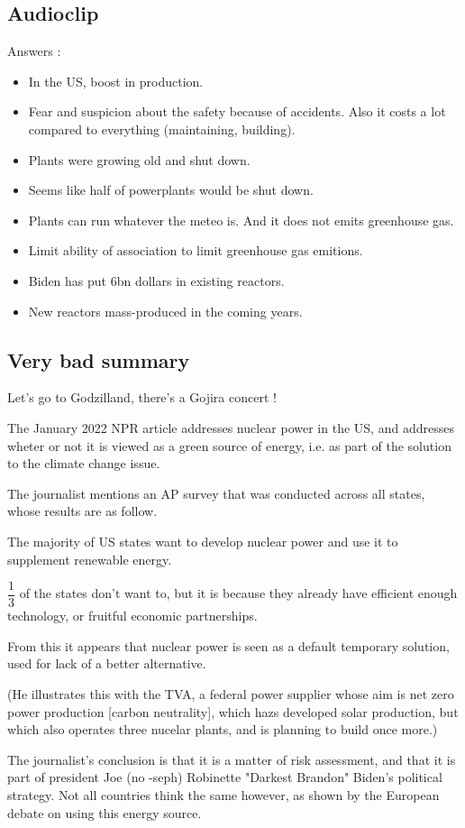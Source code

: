 \documentclass[a4paper,12pt]{book}
\begin{document}
\subsection{Audioclip}
Answers :
\begin{itemize}
\item In the US, boost in production.
\item Fear and suspicion about the safety because of accidents. Also it costs a lot compared to everything (maintaining, building).
\item Plants were growing old and shut down.
\item Seems like half of powerplants would be shut down.
\item Plants can run whatever the meteo is. And it does not emits greenhouse gas.
\item Limit ability of association to limit greenhouse gas emitions.
\item Biden has put 6bn dollars in existing reactors.
\item New reactors mass-produced in the coming years.
\end{itemize}

\subsection{Very bad summary}
Let's go to Godzilland, there's a Gojira concert !
\par The January 2022 NPR article addresses nuclear power in the US, and addresses wheter or not it is viewed as a green source of energy, i.e. as part of the solution to the climate change issue.
\par The journalist mentions an AP survey that was conducted across all states, whose results are as follow.
\par The majority of US states want to develop nuclear power and use it to supplement renewable energy.
\par $\dfrac{1}{3}$ of the states don't want to, but it is because they already have efficient enough technology, or fruitful economic partnerships.
\par From this it appears that nuclear power is seen as a default temporary solution, used for lack of a better alternative.
\par (He illustrates this with the TVA, a federal power supplier whose aim is net zero power production [carbon neutrality], which hazs developed solar production, but which also operates three nucelar plants, and is planning to build once more.)
\par The journalist's conclusion is that it is a matter of risk assessment, and that it is part of president Joe (no -seph) Robinette "Darkest Brandon" Biden's political strategy. Not all countries think the same however, as shown by the European debate on using this energy source.
\end{document}
